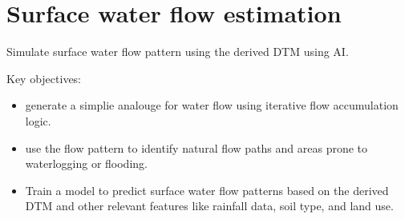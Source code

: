 	\section{Surface water flow estimation}
Simulate surface water flow pattern using the derived DTM using AI.
    

Key objectives:
	\begin{itemize}
		\item generate a simplie analouge for water flow using iterative flow accumulation logic.
        \item use the flow pattern to identify natural flow paths and areas prone to waterlogging or flooding.
		\item Train a model to predict surface water flow patterns based on the derived DTM and other relevant features like rainfall data, soil type, and land use.
	\end{itemize}